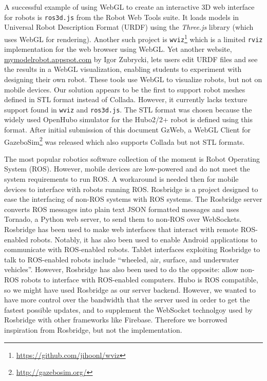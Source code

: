 \documentclass[letterpaper, 10 pt, conference]{ieee/ieeeconf}  %
\begin{document}
A successful example of using WebGL to create an interactive 3D web interface for robots is \texttt{ros3d.js} from the Robot Web Tools suite.
It loads models in Universal Robot Description Format (URDF) using the \textit{Three.js} library (which uses WebGL for rendering). \cite{alexander2012robot}
Another such project is \texttt{wviz}\footnote{\url{https://github.com/jihoonl/wviz}} which is a limited \texttt{rviz} implementation for the web browser using WebGL.
Yet another website, \url{mymodelrobot.appspot.com} by Igor Zubrycki, lets users edit URDF files and see the results in a WebGL visualization, enabling students to experiment with designing their own robot.
These tools use WebGL to visualize robots, but not on mobile devices.
Our solution appears to be the first to support robot meshes defined in STL format instead of Collada.
However, it currently lacks texture support found in \texttt{wviz} and \texttt{ros3d.js}.
The STL format was chosen because the widely used OpenHubo simulator for the Hubo2/2+ robot  \cite{lofaro2012humanoid} is defined using this format.
After initial submission of this document GzWeb, a WebGL Client for GazeboSim\footnote{\url{http://gazebosim.org/}} was released which also supports Collada but not STL formats.

The most popular robotics software collection of the moment is Robot Operating System (ROS). \cite{quigley2009ros}
However, mobile devices are low-powered and do not meet the system requirements to run ROS.
A workaround is needed then for mobile devices to interface with robots running ROS.
Rosbridge is a project designed to ease the interfacing of non-ROS systems with ROS systems. \cite{crick2011rosbridge}
The Rosbridge server converts ROS messages into plain text JSON formatted messages and uses Tornado, a Python web server, to send them to non-ROS over WebSockets.
Rosbridge has been used to make web interfaces that interact with remote ROS-enabled robots. \cite{pitzer2012pr2}
Notably, it has also been used to enable Android applications to communicate with ROS-enabled robots.
Tablet interfaces exploiting Rosbridge to talk to ROS-enabled robots include ``wheeled, air, surface, and underwater vehicles''.  \cite{speers2013diver}
However, Rosbridge has also been used to do the opposite: allow non-ROS robots to interface with ROS-enabled computers. \cite{dallaroslink} \cite{aznar2014ros}
Hubo is ROS compatible, so we might have used Rosbridge as our server backend.
However, we wanted to have more control over the bandwidth that the server used in order to get the fastest possible updates, and to supplement the WebSocket technolgoy used by Rosbridge with other frameworks like Firebase.
Therefore we borrowed inspiration from Rosbridge, but not the implementation.
\end{document}
